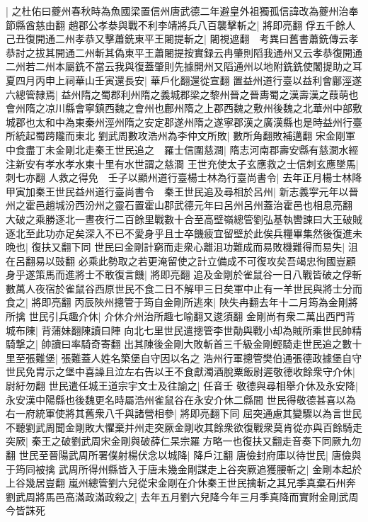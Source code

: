 |{
	之杜佑曰夔州春秋時為魚國梁置信州唐武德二年避皇外祖獨孤信諱改為夔州治奉節縣酋慈由翻}
趙郡公孝㳟與戰不利李靖將兵八百襲擊斬之|{
	將即亮翻}
俘五千餘人己丑復開通二州孝恭又擊蕭銑東平王闍提斬之|{
	闍視遮翻　考異曰舊書蕭銑傳云孝恭討之拔其開通二州斬其偽東平王蕭闍提按實録云冉肇則䧟我通州又云孝恭復開通二州若二州本屬銑不當云我與復蓋肇則先據開州又䧟通州以地附銑銑使闍提助之耳}
夏四月丙申上祠華山壬寅還長安|{
	華戶化翻還從宣翻}
置益州道行臺以益利會鄜涇遂六總管隸焉|{
	益州隋之蜀郡利州隋之義城郡梁之黎州晉之晉夀蜀之漢壽漢之葭萌也會州隋之凉川縣會寧鎮西魏之會州也鄜州隋之上郡西魏之敷州後魏之北華州中部敷城郡也太和中為東秦州涇州隋之安定郡遂州隋之遂寧郡漢之廣漢縣也是時益州行臺所統起蜀跨隴而東北}
劉武周數攻浩州為李仲文所敗|{
	數所角翻敗補邁翻}
宋金剛軍中食盡丁未金剛北走秦王世民追之　羅士信圍慈澗|{
	隋志河南郡壽安縣有慈澗水經注新安有孝水孝水東十里有水世謂之慈澗}
王世充使太子玄應救之士信刺玄應墜馬|{
	刺七亦翻}
人救之得免　壬子以顯州道行臺楊士林為行臺尚書令|{
	去年正月楊士林降}
甲寅加秦王世民益州道行臺尚書令　秦王世民追及尋相於呂州|{
	新志義寜元年以晉州之霍邑趙城汾西汾州之靈石置霍山郡武德元年曰呂州呂州蓋治霍邑也相息亮翻}
大破之乘勝逐北一晝夜行二百餘里戰數十合至高壁嶺總管劉弘基執轡諫曰大王破賊逐北至此功亦足矣深入不已不愛身乎且士卒饑疲宜留壁於此俟兵糧畢集然後復進未晩也|{
	復扶又翻下同}
世民曰金剛計窮而走衆心離沮功難成而易敗機難得而易失|{
	沮在呂翻易以豉翻}
必乘此勢取之若更淹留使之計立備成不可復攻矣吾竭忠徇國豈顧身乎遂策馬而進將士不敢復言饑|{
	將即亮翻}
追及金剛於雀鼠谷一日八戰皆破之俘斬數萬人夜宿於雀鼠谷西原世民不食二日不解甲三日矣軍中止有一羊世民與將士分而食之|{
	將即亮翻}
丙辰陜州摠管于筠自金剛所逃來|{
	陜失冉翻去年十二月筠為金剛將所擒}
世民引兵趣介休|{
	介休介州治所趣七喻翻又逡須翻}
金剛尚有衆二萬出西門背城布陳|{
	背蒲妹翻陳讀曰陣}
向北七里世民遣摠管李世勣與戰小却為賊所乘世民帥精騎撃之|{
	帥讀曰率騎奇寄翻}
出其陳後金剛大敗斬首三千級金剛輕騎走世民追之數十里至張難堡|{
	張難蓋人姓名築堡自守因以名之}
浩州行軍摠管樊伯通張德政據堡自守世民免胄示之堡中喜譟且泣左右告以王不食獻濁酒脫粟飯尉遲敬德收餘衆守介休|{
	尉紆勿翻}
世民遣任城王道宗宇文士及往諭之|{
	任音壬}
敬德與尋相舉介休及永安降|{
	永安漢中陽縣也後魏更名時屬浩州雀鼠谷在永安介休二縣間}
世民得敬德甚喜以為右一府統軍使將其舊衆八千與諸營相參|{
	將即亮翻下同}
屈突通慮其變驟以為言世民不聽劉武周聞金剛敗大懼棄并州走突厥金剛收其餘衆欲復戰衆莫肯從亦與百餘騎走突厥|{
	秦王之破劉武周宋金剛與破薛仁杲宗羅方略一也復扶又翻走音奏下同厥九勿翻}
世民至晉陽武周所署僕射楊伏念以城降|{
	降戶江翻}
唐儉封府庫以待世民|{
	唐儉與于筠同被擒}
武周所得州縣皆入于唐未幾金剛謀走上谷突厥追獲腰斬之|{
	金剛本起於上谷幾居豈翻}
嵐州總管劉六兒從宋金剛在介休秦王世民擒斬之其兄季真棄石州奔劉武周將馬邑高滿政滿政殺之|{
	去年五月劉六兒降今年三月季真降而實附金剛武周今皆誅死}
